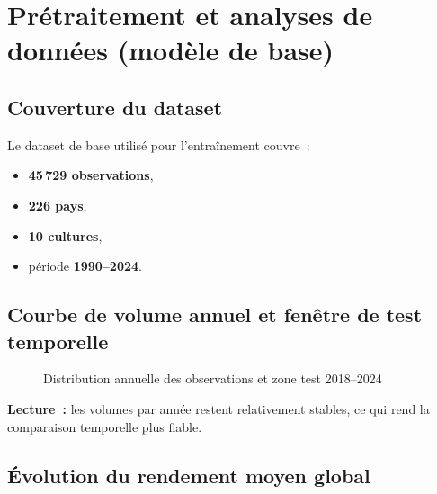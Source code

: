 \section{Prétraitement et analyses de données (modèle de base)}

\subsection{Couverture du dataset}

Le dataset de base utilisé pour l'entraînement couvre~:
\begin{itemize}[leftmargin=1.5cm]
  \item \textbf{45\,729 observations},
  \item \textbf{226 pays},
  \item \textbf{10 cultures},
  \item période \textbf{1990--2024}.
\end{itemize}

\subsection{Courbe de volume annuel et fenêtre de test temporelle}

\begin{figure}[H]
\centering
{}
\caption{Distribution annuelle des observations et zone test 2018--2024}
\label{fig:baseline-observations-year}
\end{figure}

\textbf{Lecture~:} les volumes par année restent relativement stables, ce qui rend la comparaison temporelle plus fiable.

\subsection{Évolution du rendement moyen global}

